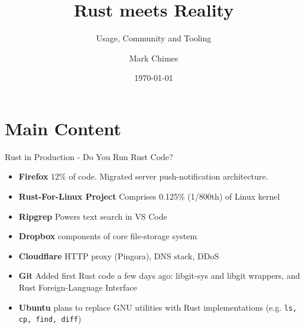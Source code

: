 \documentclass{beamer}
\title{Rust meets Reality}
\subtitle{Usage, Community and Tooling}
\author{Mark Chimes}
\date{\today}
\begin{document}
\begin{frame}
    \titlepage
\end{frame}


\section{Main Content}



\begin{frame}{Rust in Production - Do You Run Rust Code?} 
	\begin{block}{}

\begin{itemize} 
	\item \textbf{Firefox} 
	12\% of code. Migrated server push-notification architecture.
	\item \textbf{Rust-For-Linux Project} 
	Comprises 0.125\% (1/800th) of Linux kernel
	\item \textbf{Ripgrep} 
	Powers text search in VS Code
	\item \textbf{Dropbox}
	components of core file-storage system
	\item \textbf{Cloudflare}
	HTTP proxy (Pingora), DNS stack, DDoS 
	\item \textbf{Git} Added first Rust code a few days ago: 
	libgit-sys and libgit wrappers, and Rust Foreign-Language Interface
	\item \textbf{Ubuntu} plans to replace GNU utilities with Rust implementations
	(e.g. \texttt{ls, cp, find, diff})
\end{itemize} 
\end{block}
\end{frame} 
\end{document}
